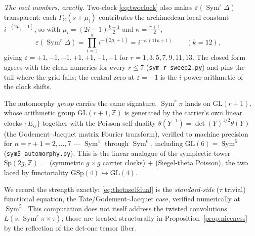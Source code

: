 \documentclass[11pt]{article}
\theoremstyle{definition}
\newcommand{\Sym}{\operatorname{Sym}}
\begin{document}
\emph{The root numbers, exactly.} Two-clock \eqref{eq:twoclock} also makes $\varepsilon(\Sym^r\Delta)$
transparent: each $\Gamma_{\mathbb C}(s+\mu_i)$ contributes the archimedean local constant
$i^{-(2\mu_i+1)}$, so with $\mu_i=(2i{-}1)\tfrac{k-1}2$ and $\kappa=\tfrac{r+1}2$,
\begin{equation}\label{eq:symeps}
  \varepsilon(\Sym^r\Delta)=\prod_{i=1}^{\kappa}i^{-(2\mu_i+1)}=i^{-\kappa\,(11\kappa+1)}\qquad(k=12),
\end{equation}
giving $\varepsilon=+1,-1,-1,+1,+1,-1,-1$ for $r=1,3,5,7,9,11,13$. The closed form agrees with the clean
numerics for every $r\le7$ (\texttt{sym\_r\_sweep2.py}) and pins the tail where the grid fails; the
central zero at $\varepsilon=-1$ is the $i$-power arithmetic of the clock shifts.

The automorphy \emph{group} carries the same signature. $\Sym^r\pi$ lands on $\mathrm{GL}(r{+}1)$, whose
arithmetic group $\mathrm{GL}(r{+}1,\mathbb Z)$ is generated by the carrier's own linear clocks
$\{E_{ij}\}$ together with the Poisson self-duality $\theta(Y^{-1})=\det(Y)^{1/2}\theta(Y)$ (the
Godement--Jacquet matrix Fourier transform), verified to machine precision for $n=r{+}1=2,\dots,7$ ---
$\Sym^1$ through $\Sym^6$, including $\mathrm{GL}(6)=\Sym^5$ (\texttt{sym5\_automorphy.py}). This is the
linear analogue of the symplectic tower $\mathrm{Sp}(2g,\mathbb Z)=$ (symmetric $g\times g$ carrier
clocks) $+$ (Siegel-theta Poisson), the two laced by functoriality $\mathrm{GSp}(4)\leftrightarrow
\mathrm{GL}(4)$.

We record the strength exactly: \eqref{eq:thetaselfdual} is the \emph{standard-side} ($\tau$ trivial)
functional equation, the Tate/Godement--Jacquet case, verified numerically at $\Sym^5$. This computation
does not itself address the twisted convolutions $L(s,\Sym^r\pi\times\tau)$; those are treated
structurally in Proposition~\ref{prop:niceness} by the reflection of the det-one tensor fiber.
\end{document}
